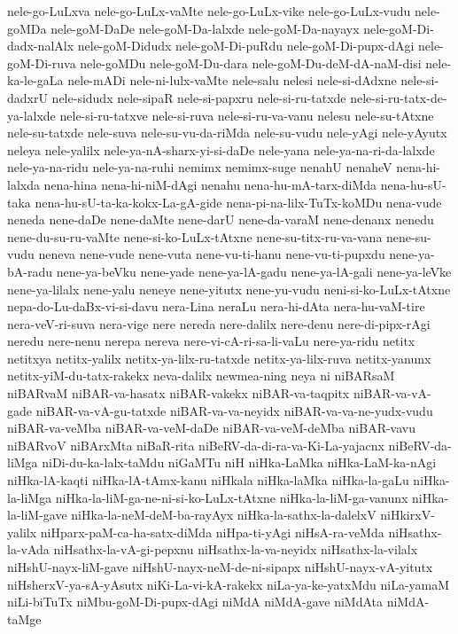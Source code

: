 {nele-go-LuLxva
nele-go-LuLx-vaMte
nele-go-LuLx-vike
nele-go-LuLx-vudu
nele-goMDa
nele-goM-DaDe
nele-goM-Da-lalxde
nele-goM-Da-nayayx
nele-goM-Di-dadx-nalAlx
nele-goM-Didudx
nele-goM-Di-puRdu
nele-goM-Di-pupx-dAgi
nele-goM-Di-ruva
nele-goMDu
nele-goM-Du-dara
nele-goM-Du-deM-dA-naM-disi
nele-ka-le-gaLa
nele-mADi
nele-ni-lulx-vaMte
nele-salu
nelesi
nele-si-dAdxne
nele-si-dadxrU
nele-sidudx
nele-sipaR
nele-si-papxru
nele-si-ru-tatxde
nele-si-ru-tatx-de-ya-lalxde
nele-si-ru-tatxve
nele-si-ruva
nele-si-ru-va-vanu
nelesu
nele-su-tAtxne
nele-su-tatxde
nele-suva
nele-su-vu-da-riMda
nele-su-vudu
nele-yAgi
nele-yAyutx
neleya
nele-yalilx
nele-ya-nA-sharx-yi-si-daDe
nele-yana
nele-ya-na-ri-da-lalxde
nele-ya-na-ridu
nele-ya-na-ruhi
nemimx
nemimx-suge
nenahU
nenaheV
nena-hi-lalxda
nena-hina
nena-hi-niM-dAgi
nenahu
nena-hu-mA-tarx-diMda
nena-hu-sU-taka
nena-hu-sU-ta-ka-kokx-La-gA-gide
nena-pi-na-lilx-TuTx-koMDu
nena-vude
neneda
nene-daDe
nene-daMte
nene-darU
nene-da-varaM
nene-denanx
nenedu
nene-du-su-ru-vaMte
nene-si-ko-LuLx-tAtxne
nene-su-titx-ru-va-vana
nene-su-vudu
neneva
nene-vude
nene-vuta
nene-vu-ti-hanu
nene-vu-ti-pupxdu
nene-ya-bA-radu
nene-ya-beVku
nene-yade
nene-ya-lA-gadu
nene-ya-lA-gali
nene-ya-leVke
nene-ya-lilalx
nene-yalu
neneye
nene-yitutx
nene-yu-vudu
neni-si-ko-LuLx-tAtxne
nepa-do-Lu-daBx-vi-si-davu
nera-Lina
neraLu
nera-hi-dAta
nera-hu-vaM-tire
nera-veV-ri-suva
nera-vige
nere
nereda
nere-dalilx
nere-denu
nere-di-pipx-rAgi
neredu
nere-nenu
nerepa
nereva
nere-vi-cA-ri-sa-li-vaLu
nere-ya-ridu
netitx
netitxya
netitx-yalilx
netitx-ya-lilx-ru-tatxde
netitx-ya-lilx-ruva
netitx-yanunx
netitx-yiM-du-tatx-rakekx
neva-dalilx
newmea-ning
neya
ni
niBARsaM
niBARvaM
niBAR-va-hasatx
niBAR-vakekx
niBAR-va-taqpitx
niBAR-va-vA-gade
niBAR-va-vA-gu-tatxde
niBAR-va-va-neyidx
niBAR-va-va-ne-yudx-vudu
niBAR-va-veMba
niBAR-va-veM-daDe
niBAR-va-veM-deMba
niBAR-vavu
niBARvoV
niBArxMta
niBaR-rita
niBeRV-da-di-ra-va-Ki-La-yajacnx
niBeRV-da-liMga
niDi-du-ka-lalx-taMdu
niGaMTu
niH
niHka-LaMka
niHka-LaM-ka-nAgi
niHka-lA-kaqti
niHka-lA-tAmx-kanu
niHkala
niHka-laMka
niHka-la-gaLu
niHka-la-liMga
niHka-la-liM-ga-ne-ni-si-ko-LuLx-tAtxne
niHka-la-liM-ga-vanunx
niHka-la-liM-gave
niHka-la-neM-deM-ba-rayAyx
niHka-la-sathx-la-dalelxV
niHkirxV-yalilx
niHparx-paM-ca-ha-satx-diMda
niHpa-ti-yAgi
niHsA-ra-veMda
niHsathx-la-vAda
niHsathx-la-vA-gi-pepxnu
niHsathx-la-va-neyidx
niHsathx-la-vilalx
niHshU-nayx-liM-gave
niHshU-nayx-neM-de-ni-sipapx
niHshU-nayx-vA-yitutx
niHsherxV-ya-sA-yAsutx
niKi-La-vi-kA-rakekx
niLa-ya-ke-yatxMdu
niLa-yamaM
niLi-biTuTx
niMbu-goM-Di-pupx-dAgi
niMdA
niMdA-gave
niMdAta
niMdA-taMge
}
